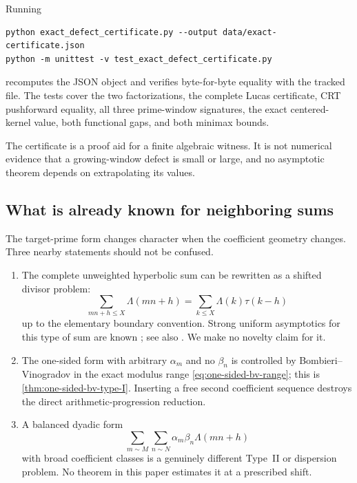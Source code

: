 Running
\begin{verbatim}
python exact_defect_certificate.py --output data/exact-certificate.json
python -m unittest -v test_exact_defect_certificate.py
\end{verbatim}
recomputes the JSON object and verifies byte-for-byte equality with the
tracked file.  The tests cover the two factorizations, the complete Lucas
certificate, CRT pushforward equality, all three prime-window signatures,
the exact centered-kernel value, both functional gaps, and both minimax
bounds.

\begin{remark}\label{rem:certificate-scope}
The certificate is a proof aid for a finite algebraic witness.  It is not
numerical evidence that a growing-window defect is small or large, and no
asymptotic theorem depends on extrapolating its values.
\end{remark}

\subsection{What is already known for neighboring sums}

The target-prime form changes character when the coefficient geometry
changes.  Three nearby statements should not be confused.
\begin{enumerate}[label=\textbf{K\arabic*.},leftmargin=3.2em]
 \item The complete unweighted hyperbolic sum can be rewritten as a shifted
 divisor problem:
 \[
  \sum_{mn+h\le X}\Lambda(mn+h)
  =\sum_{k\le X}\Lambda(k)\tau(k-h)
 \]
 up to the elementary boundary convention.  Strong uniform asymptotics for
 this type of sum are known \citep[Theorem~1.1]{AssingBlomerLi2021}; see
 also \citet{Fouvry1985}.  We make no novelty claim for it.
 \item The one-sided form with arbitrary $\alpha_m$ and no $\beta_n$ is
 controlled by Bombieri--Vinogradov in the exact modulus range
 \eqref{eq:one-sided-bv-range}; this is
 \cref{thm:one-sided-bv-type-I}.  Inserting a free second coefficient
 sequence destroys the direct arithmetic-progression reduction.
 \item A balanced dyadic form
 \[
  \sum_{m\sim M}\sum_{n\sim N}
  \alpha_m\beta_n\Lambda(mn+h)
 \]
 with broad coefficient classes is a genuinely different Type~II or
 dispersion problem.  No theorem in this paper estimates it at a prescribed
 shift.
\end{enumerate}

